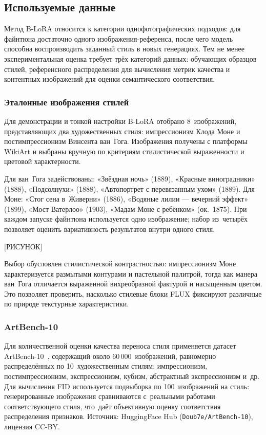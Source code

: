 
\subsection{Используемые данные}
\label{sec:datasets}

Метод B-LoRA относится к категории однофотографических подходов: для файнтюна
достаточно одного изображения-референса, после чего модель способна воспроизводить
заданный стиль в новых генерациях. Тем не менее экспериментальная оценка требует
трёх категорий данных: обучающих образцов стилей, референсного распределения для
вычисления метрик качества и контентных изображений для оценки семантического
соответствия.

\subsubsection*{Эталонные изображения стилей}

Для демонстрации и тонкой настройки B-LoRA отобрано 8~изображений, представляющих
два художественных стиля: импрессионизм Клода Моне и постимпрессионизм Винсента
ван~Гога. Изображения получены с платформы WikiArt и выбраны вручную по критериям
стилистической выраженности и цветовой характерности.

Для ван~Гога задействованы: «Звёздная ночь» (1889), «Красные виноградники» (1888),
«Подсолнухи» (1888), «Автопортрет с перевязанным ухом» (1889). Для Моне: «Стог сена
в~Живерни» (1886), «Водяные лилии --- вечерний эффект» (1899), «Мост Ватерлоо» (1903),
«Мадам Моне с ребёнком» (ок.~1875). При каждом запуске файнтюна используется одно
изображение; набор из~четырёх позволяет оценить вариативность результатов внутри
одного стиля.

[РИСУНОК]

Выбор обусловлен стилистической контрастностью: импрессионизм Моне характеризуется
размытыми контурами и пастельной палитрой, тогда как манера ван~Гога отличается
выраженной вихреобразной фактурой и насыщенным цветом. Это позволяет проверить,
насколько стилевые блоки FLUX фиксируют различные по природе текстурные характеристики.

\subsubsection*{ArtBench-10}

Для количественной оценки качества переноса стиля применяется датасет
ArtBench-10~\cite{liao2022artbench}, содержащий около 60\,000~изображений,
равномерно распределённых по 10~художественным стилям: импрессионизм,
постимпрессионизм, экспрессионизм, кубизм, абстрактный экспрессионизм и~др.
Для вычисления FID используется подвыборка по 100~изображений на стиль:
генерированные изображения сравниваются с~реальными работами соответствующего
стиля, что~даёт объективную оценку соответствия распределения признаков.
Источник: HuggingFace Hub (\texttt{Doub7e/ArtBench-10}), лицензия CC-BY.

